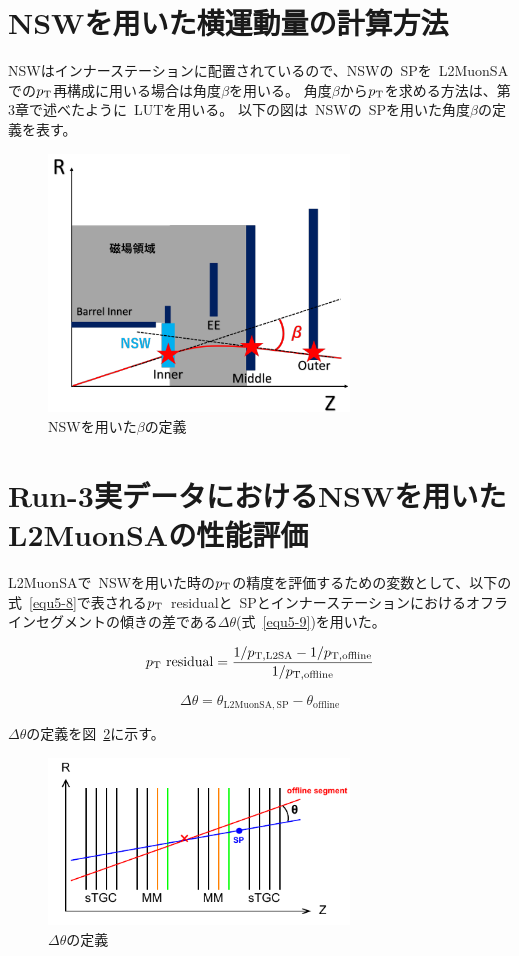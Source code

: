\section{NSWを用いた横運動量の計算方法}\label{chapter5-2}
NSWはインナーステーションに配置されているので、NSWの~SPを~L2MuonSAでの$p_\mathrm{T}$再構成に用いる場合は角度$\beta$を用いる。
角度$\beta$から$p_\mathrm{T}$を求める方法は、第3章で述べたように~LUTを用いる。
以下の図は~NSWの~SPを用いた角度$\beta$の定義を表す。
\begin{figure}[H]
    \centering
    \includegraphics[clip, width=8cm]{fig/5/NSW_beta.png}
    \caption{NSWを用いた$\beta$の定義\cite{article:noguchi}}
    \label{fig:5-4}
\end{figure}

\section{Run-3実データにおけるNSWを用いたL2MuonSAの性能評価}\label{chapter5-3}

L2MuonSAで~NSWを用いた時の$p_\mathrm{T}$の精度を評価するための変数として、以下の式~\eqref{equ5-8}で表される$p_\mathrm{T}$~residualと~SPとインナーステーションにおけるオフラインセグメントの傾きの差である$\Delta\theta$(式~\eqref{equ5-9})を用いた。

\begin{equation}
    p_\mathrm{T}~\mathrm{residual}= \frac{1/p_{\mathrm{T,L2SA}} - 1/p_{\mathrm{T,offline}}}{1/p_{\mathrm{T,offline}}}\label{equ5-8}
\end{equation}

\begin{equation}
    \Delta \theta = \theta_{\mathrm{L2MuonSA, SP}} - \theta_{\mathrm{offline}}\label{equ5-9}
\end{equation}

$\Delta \theta$の定義を図~\ref{fig:5-7}に示す。
\begin{figure}[H]
    \centering
    \includegraphics[clip, width=8cm]{fig/5/deltaTheta.pdf}
    \caption{$\Delta \theta$の定義}
    \label{fig:5-7}
\end{figure}

